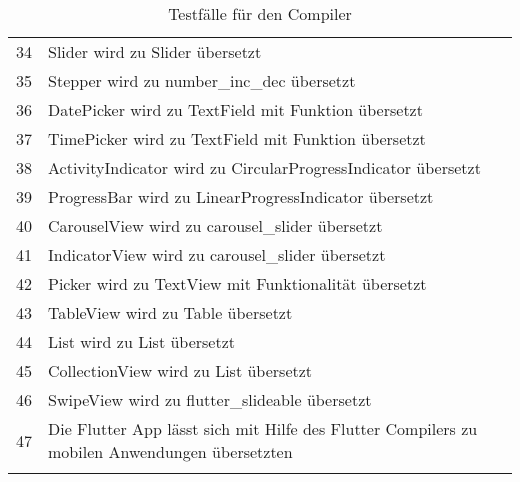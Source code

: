 \begin{xltabular}{\textwidth}{l|X|l}
	34            			& Slider		       					wird zu 		Slider	 		übersetzt &  \checkmark   	\\
	35            			& Stepper		       				wird zu  		number\_inc\_dec	 		übersetzt &  \checkmark   	\\
	36            			& DatePicker		       			wird zu  		TextField mit Funktion		übersetzt &  \checkmark   	\\
	37            			& TimePicker		       			wird zu  		TextField mit Funktion	 		übersetzt &  \checkmark   	\\
	38            			& ActivityIndicator		       	wird zu  		CircularProgressIndicator 		übersetzt &  \checkmark   	\\
	39            			& ProgressBar		       			wird zu 		LinearProgressIndicator 		übersetzt &  \checkmark   	\\
	40            			& CarouselView		       		wird zu  		carousel\_slider  		übersetzt &  \checkmark   	\\
	41            			& IndicatorView		       		wird zu  		carousel\_slider			übersetzt &  \checkmark   	\\
	42            			& Picker		       					wird zu  		TextView mit Funktionalität 		übersetzt &  \checkmark   	\\
	43            			& TableView		       				wird zu  		Table		übersetzt &  \checkmark   	\\
	44            			& List		       						wird zu  		List 		übersetzt &  \checkmark   	\\
	45            			& CollectionView		       		wird zu  		List 		übersetzt &  \checkmark   	\\
	46            			& SwipeView		       			wird zu  		flutter\_slideable 		übersetzt &  \checkmark   	\\
	47            			& Die Flutter App lässt sich mit Hilfe des Flutter Compilers zu mobilen Anwendungen übersetzten &  \checkmark   	\\


\caption[]{Testfälle für den Compiler}
 \label{tab:Testcasescomplete}
\end{xltabular}

